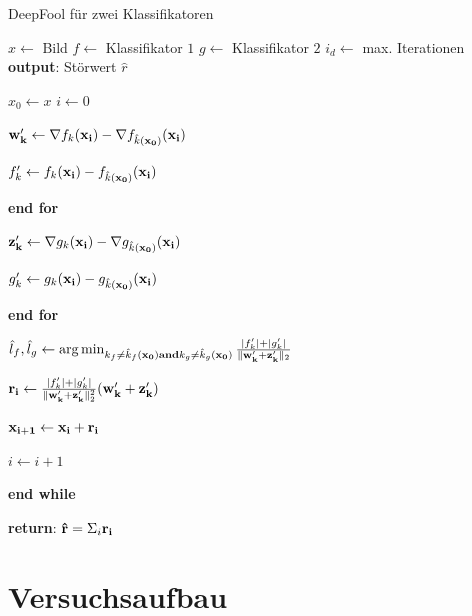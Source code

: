 \documentclass{FFHS_Thesis_Additions/ffhsthesis}
\begin{document}
 
\begin{algorithm}
\caption{DeepFool für zwei Klassifikatoren}
\label{alg_multifool}
\begin{algorithmic}[1]

\State $x \gets$ Bild
\State $f \gets$ Klassifikator $1$
\State $g \gets$ Klassifikator $2$
\State $i_d \gets$ max. Iterationen
\State \textbf{output}: Störwert $\hat{r}$

\State $x_0 \gets x$
\State $i \gets 0$



\State $\bold{w'_k} \gets \nabla f_k(\bold{x_i}) - \nabla f_{\hat{k}(\bold{x_0})}(\bold{x_i}) $

\State $f'_k \gets f_k(\bold{x_i}) - f_{\hat{k}(\bold{x_0})}(\bold{x_i}) $

\EndFor
\State \textbf{end for}


\State $\bold{z'_k} \gets \nabla g_k(\bold{x_i}) - \nabla g_{\hat{k}(\bold{x_0})}(\bold{x_i}) $

\State $g'_k \gets g_k(\bold{x_i}) - g_{\hat{k}(\bold{x_0})}(\bold{x_i}) $

\EndFor
\State \textbf{end for}


\State $\hat{l}_f, \hat{l}_g \gets \arg \min_{k_f \neq \hat{k}_f(\bold{x_0}) \bold{and} k_g \neq \hat{k}_g(\bold{x_0})} \frac{ \vert f'_k \vert + \vert g'_k \vert}{\Vert \bold{w'_k} + \bold{z'_k} \Vert_2}  $



\State $\bold{r_i} \gets {\frac{ \vert f'_k \vert + \vert g'_k \vert }{\Vert \bold{w'_k} + \bold{z'_k} \Vert^2_2}} (\bold{w'_k} + \bold{z'_k}) $

\State $\bold{x_{i+1}} \gets \bold{x_i} + \bold{r_i}$

\State $i \gets i + 1$

\EndWhile
\State \textbf{end while}

\State \textbf{return}: $\bold{\hat{r}} = \Sigma_i \bold{r_i} $

\end{algorithmic}
\end{algorithm}




\chapter{Versuchsaufbau}
\label{c_versuchsaufbau}
\end{document}
